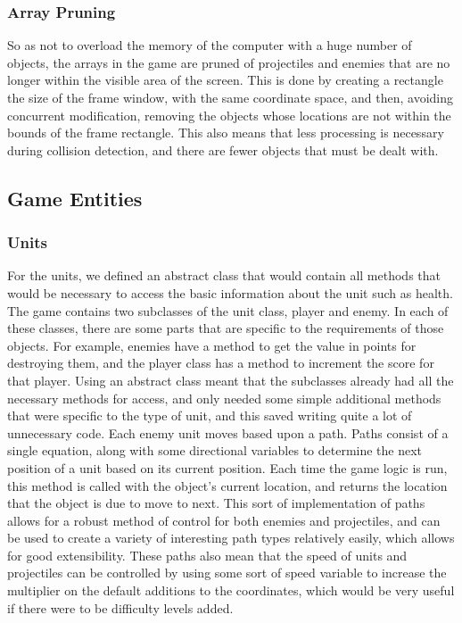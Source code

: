 \subsubsection{Array Pruning}
So as not to overload the memory of the computer with a huge number of objects, the arrays in the game are pruned of projectiles and enemies that are no longer within the visible area of the screen. This is done by creating a rectangle the size of the frame window, with the same coordinate space, and then, avoiding concurrent modification, removing the objects whose locations are not within the bounds of the frame rectangle. This also means that less processing is necessary during collision detection, and there are fewer objects that must be dealt with.
\subsection{Game Entities}
\subsubsection{Units}
For the units, we defined an abstract class that would contain all methods that would be necessary to access the basic information about the unit such as health. The game contains two subclasses of the unit class, player and enemy. In each of these classes, there are some parts that are specific to the requirements of those objects. For example, enemies have a method to get the value in points for destroying them, and the player class has a method to increment the score for that player. Using an abstract class meant that the subclasses already had all the necessary methods for access, and only needed some simple additional methods that were specific to the type of unit, and this saved writing quite a lot of unnecessary code. Each enemy unit moves based upon a path. Paths consist of a single equation, along with some directional variables to determine the next position of a unit based on its current position. Each time the game logic is run, this method is called with the object's current location, and returns the location that the object is due to move to next. This sort of implementation of paths allows for a robust method of control for both enemies and projectiles, and can be used to create a variety of interesting path types relatively easily, which allows for good extensibility. These paths also mean that the speed of units and projectiles can be controlled by using some sort of speed variable to increase the multiplier on the default additions to the coordinates, which would be very useful if there were to be difficulty levels added.
